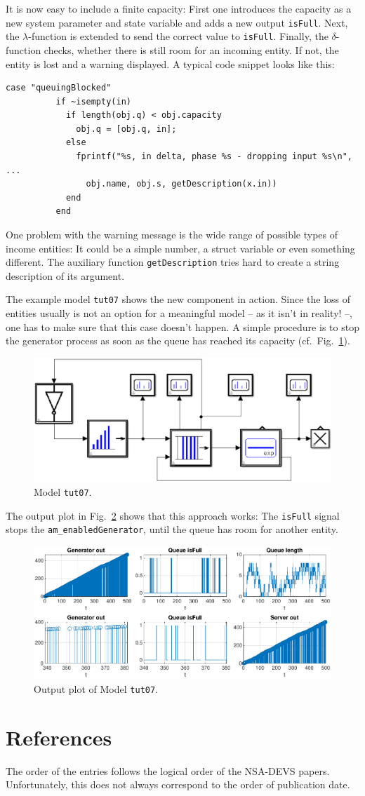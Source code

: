 \documentclass[12pt,oneside,a4paper,bibtotoc,BCOR=0pt,DIV=20]{scrreprt}
\newcommand{\cft}[1]{\mbox{\texttt{#1}}}   %
\begin{document}
It is now easy to include a finite capacity: First one introduces the capacity
as a new system parameter and state variable and adds a new output
\cft{isFull}. Next, the $\lambda$-function is extended to send the correct
value to \cft{isFull}. Finally, the $\delta$-function checks, whether there is
still room for an incoming entity. If not, the entity is lost and a warning
displayed. A typical code snippet looks like this:
\begin{lstlisting}[caption={Part of the $\delta$ function of \cft{am\_finiteQueue.m}.},captionpos=b,label=lst5]
        case "queuingBlocked"
          if ~isempty(in)
            if length(obj.q) < obj.capacity
              obj.q = [obj.q, in];
            else
              fprintf("%s, in delta, phase %s - dropping input %s\n", ...
                obj.name, obj.s, getDescription(x.in))           
            end
          end
\end{lstlisting}
One problem with the warning message is the wide range of possible types of
income entities: It could be a simple number, a struct variable or even
something different. The auxiliary function \cft{getDescription} tries hard to
create a string description of its argument.

The example model \cft{tut07} shows the new component in action. Since the loss
of entities usually is not an option for a meaningful model -- as it isn't in
reality! --, one has to make sure that this case doesn't happen. A simple
procedure is to stop the generator process as soon as the queue has reached its
capacity (cf.\ Fig.\ \ref{fig_19}).

\begin{figure}[ht]
\centering
\includegraphics[width=0.58\columnwidth]{images/bild19.pdf}
\caption{Model \cft{tut07}.}
\label{fig_19}
\end{figure}

The output plot in Fig.\ \ref{fig_20} shows that this approach works: The
\cft{isFull} signal stops the \cft{am\_enabledGenerator}, until the queue has
room for another entity.

\begin{figure}[ht]
\centering
\includegraphics[width=0.65\columnwidth]{images/bild20.pdf}
\caption{Output plot of Model \cft{tut07}.}
\label{fig_20}
\end{figure}


\chapter{References}

The order of the entries follows the logical order of the NSA-DEVS
papers. Unfortunately, this does not always correspond to the order of
publication date.

\printbibliography[heading=none]
\end{document}
